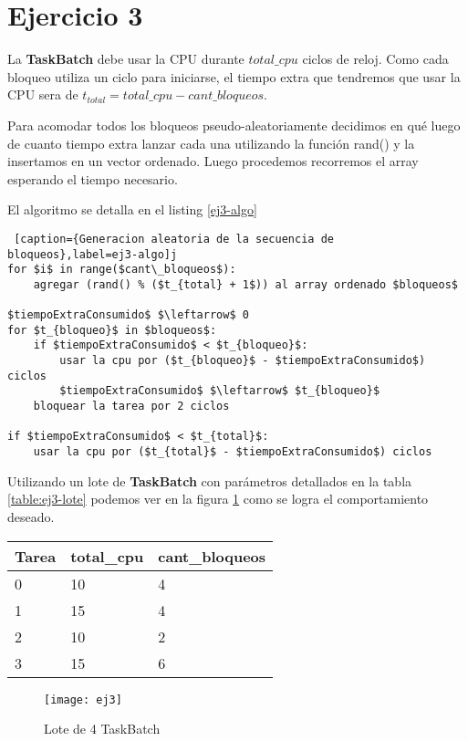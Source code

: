 \section{Ejercicio 3}

La \textbf{TaskBatch} debe usar la CPU durante $total\_cpu$ ciclos de reloj.
Como cada bloqueo utiliza un ciclo para iniciarse, el tiempo extra que tendremos que
usar la CPU sera de $t_{total} = total\_cpu - cant\_bloqueos$.

Para acomodar todos los bloqueos pseudo-aleatoriamente decidimos en qué luego de cuanto
tiempo extra lanzar cada una utilizando la función \textsf{rand()} y la insertamos en un vector ordenado.
Luego procedemos recorremos el array esperando el tiempo necesario.

El algoritmo se detalla en el listing \ref{ej3-algo}

\begin{lstlisting} [caption={Generacion aleatoria de la secuencia de bloqueos},label=ej3-algo]j
for $i$ in range($cant\_bloqueos$):
    agregar (rand() % ($t_{total} + 1$)) al array ordenado $bloqueos$

$tiempoExtraConsumido$ $\leftarrow$ 0
for $t_{bloqueo}$ in $bloqueos$:
    if $tiempoExtraConsumido$ < $t_{bloqueo}$:
        usar la cpu por ($t_{bloqueo}$ - $tiempoExtraConsumido$) ciclos
        $tiempoExtraConsumido$ $\leftarrow$ $t_{bloqueo}$
    bloquear la tarea por 2 ciclos

if $tiempoExtraConsumido$ < $t_{total}$:
    usar la cpu por ($t_{total}$ - $tiempoExtraConsumido$) ciclos

\end{lstlisting}

Utilizando un lote de \textbf{TaskBatch} con parámetros detallados en la tabla \ref{table:ej3-lote}
podemos ver en la figura \ref{fig:ej3} como se logra el comportamiento deseado.

\begin{center}
    \begin{tabular}{| l | l | l |}
        \hline
        Tarea & total\_cpu & cant\_bloqueos \\ \hline
        0 & 10 & 4 \\
        1 & 15 & 4 \\
        2 & 10 & 2 \\
        3 & 15 & 6 \\
        \hline
    \end{tabular}
    \label{table:ej3-lote}
\end{center}

\begin{figure}[H]
    \centering
    \texttt{[image: ej3]}
    \caption{Lote de 4 TaskBatch}
    \label{fig:ej3}
\end{figure}

